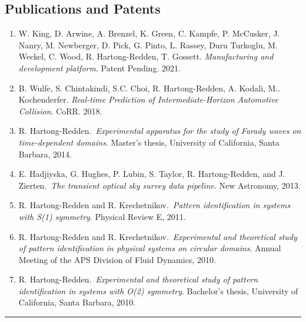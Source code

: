 \documentclass[10pt,letterpaper]{article}
\newenvironment{indentsection}[1]%
{\begin{list}{}%
	{\setlength{\leftmargin}{#1}}%
	\item[]%
}
{\end{list}}
\begin{document}
\subsection*{Publications and Patents}
\begin{indentsection}{\parindent}
\begin{enumerate}

\item 
    W. King, D. Arwine, A. Brenzel, K. Green, C. Kampfe, P. McCusker, J. Nanry, M. Newberger,
    D. Pick, G. Pinto,
    L. Rassey, Duru Turkoglu, M. Weckel, C. Wood, R. Hartong-Redden,
    T. Gossett.  \emph{ Manufacturing and development platform}. Patent Pending. 2021.


	\item B. Wulfe, S. Chintakindi, S.C. Choi, R. Hartong-Redden,  A. Kodali, M.. Kochenderfer. \emph{Real-time Prediction of Intermediate-Horizon Automotive Collision}. CoRR. 2018.
	\item R. Hartong-Redden.~\emph{Experimental apparatus for the study of Farady waves on time-dependent domains}. Master's thesis, University of California, Santa Barbara, 2014.
	\item E. Hadjiyska, G. Hughes, P. Lubin, S. Taylor, R. Hartong-Redden, and J. Zierten.~\emph{The transient optical sky survey data pipeline}. New Astronomy, 2013.
	\item R. Hartong-Redden and R. Krechetnikov.~{\em Pattern identification in systems with S(1) symmetry}. Physical Review E, 2011.
	\item R. Hartong-Redden and R. Krechetnikov.~{\em Experimental and theoretical study of pattern identification in physical systems on circular domains}. Annual Meeting of the APS Division of Fluid Dynamics, 2010.
	\item R. Hartong-Redden.~{\em Experimental and theoretical study of pattern identification in systems with O(2) symmetry}. Bachelor's thesis, University of California, Santa Barbara, 2010.
\end{enumerate}
\end{indentsection}
\hrule
\end{document}
